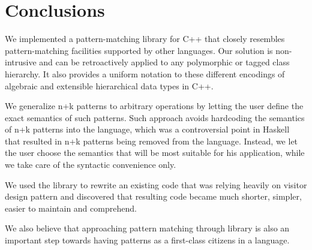 \documentclass[preprint]{sigplanconf}
\begin{document}
\section{Conclusions} %
\label{sec:cc}

We implemented a pattern-matching library for C++ that closely resembles 
pattern-matching facilities supported by other languages. Our solution is 
non-intrusive and can be retroactively applied to any polymorphic or tagged 
class hierarchy. It also provides a uniform notation to these different 
encodings of algebraic and extensible hierarchical data types in C++.

We generalize n+k patterns to arbitrary operations by letting the user define 
the exact semantics of such patterns. Such approach avoids hardcoding the 
semantics of n+k patterns into the language, which was a controversial point in 
Haskell that resulted in n+k patterns being removed from the language. Instead, 
we let the user choose the semantics that will be most suitable for his 
application, while we take care of the syntactic convenience only.

We used the library to rewrite an existing code that was relying heavily on 
visitor design pattern and discovered that resulting code became much shorter, 
simpler, easier to maintain and comprehend.

We also believe that approaching pattern matching through library is also an 
important step towards having patterns as a first-class citizens in a language.



\end{document}
